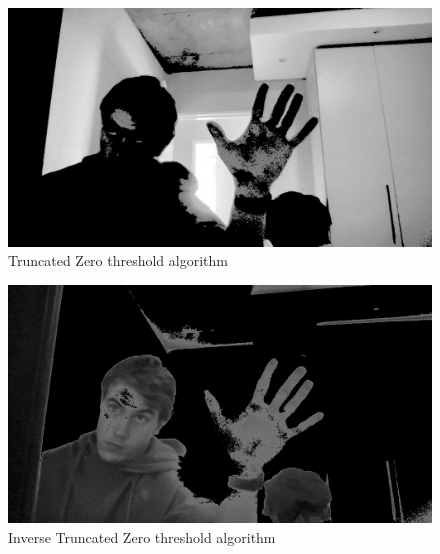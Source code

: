 \begin{figure}[h]
    \centering
    \includegraphics[width=0.4\linewidth]{figures/threshold_zero.png}
    \caption{Truncated Zero threshold algorithm}
    \label{fig:threshold_zero}
\end{figure}

\begin{figure}[h]
    \centering
    \includegraphics[width=0.4\linewidth]{figures/threshold_zero_inverse.png}
    \caption{Inverse Truncated Zero threshold algorithm}
    \label{fig:threshold_zero_inverse}
\end{figure}